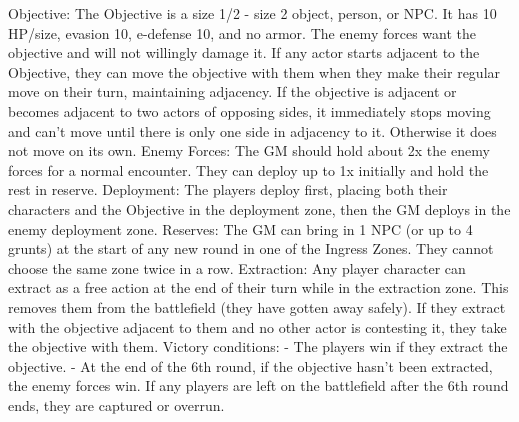                                                                Objective: The Objective is a size 1/2 - size 2
                                                               object, person, or NPC. It has 10 HP/size,
                                                               evasion 10, e-defense 10, and no armor. The
                                                               enemy forces want the objective and will not
                                                               willingly damage it. If any actor starts adjacent
                                                               to the Objective, they can move the objective
                                                               with them when they make their regular move
                                                               on their turn, maintaining adjacency. If the
                                                               objective is adjacent or becomes adjacent to
                                                               two actors of opposing sides, it immediately
                                                               stops moving and can’t move until there is only
                                                               one side in adjacency to it. Otherwise it does
                                                               not move on its own.
                                                               Enemy Forces: The GM should hold about 2x
                                                               the enemy forces for a normal encounter. They
                                                               can deploy up to 1x initially and hold the rest in
                                                               reserve.
                                                               Deployment: The players deploy first, placing
                                                               both their characters and the Objective in the
                                                               deployment zone, then the GM deploys in the
enemy deployment zone.
Reserves: The GM can bring in 1 NPC (or up to 4 grunts) at the start of any new round in one of
the Ingress Zones. They cannot choose the same zone twice in a row.
Extraction: Any player character can extract as a free action at the end of their turn while in the
extraction zone. This removes them from the battlefield (they have gotten away safely). If they
extract with the objective adjacent to them and no other actor is contesting it, they take the
objective with them.
Victory conditions:
          - The players win if they extract the objective.
          - At the end of the 6th round, if the objective hasn’t been extracted, the enemy forces win.
          If any players are left on the battlefield after the 6th round ends, they are captured or
         overrun.




